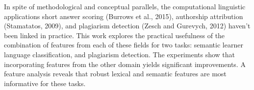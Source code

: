 In spite of methodological and conceptual parallels, the computational linguistic applications short answer scoring (Burrows et al., 2015), authorship attribution (Stamatatos, 2009), and plagiarism detection (Zesch and Gurevych, 2012) haven't been linked in practice. This work explores the practical usefulness of the combination of features from each of these fields for two tasks: semantic learner language classification, and plagiarism detection. The experiments show that incorporating features from the other domain yields significant improvements. A feature analysis reveals that robust lexical and semantic features are most informative for these tasks.
